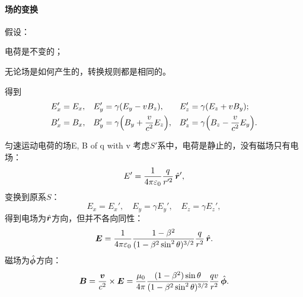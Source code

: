 \paragraph{场的变换}
假设：
\begin{compactenum}
	\item 电荷是不变的；
	\item 无论场是如何产生的，转换规则都是相同的。
\end{compactenum}
得到
\begin{align}
    E_x' &= E_x,&E_y' &= \gamma(E_y - vB_z),&E_z' &= \gamma(E_z + vB_y);\\
    B_x' &= B_x,&B_y' &= \gamma\Bigl(B_y + \frac v{c^2}E_z\Bigr),&B_z' &= \gamma\Bigl(B_z - \frac v{c^2}E_y\Bigr).
\end{align}
\begin{example}{匀速运动电荷的场}{E, B of q with v}
    考虑$S'$系中，电荷是静止的，没有磁场只有电场：
    \[
        E' = \frac1{4\pi\varepsilon_0}\frac q{r'^2}\mathop{}\!\hat{\bm{r}}',
    \]
    变换到原系$S$：
    \[
        E_x = E_x',\quad E_y = \gamma E_y',\quad E_z = \gamma E_z',
    \]
    得到电场为$\mathop{}\!\hat{\bm{r}}$方向，但并不各向同性：
    \begin{equation}
        \bm E = \frac1{4\pi\varepsilon_0}\frac{1 - \beta^2}{(1 - \beta^2\sin^2\theta)^{3/2}}\frac q{r^2}\mathop{}\!\hat{\bm{r}}.
    \end{equation}
    磁场为$\mathop{}\!\hat{\bm{\phi}}$方向：
    \begin{equation}
        \bm B = \frac{\bm v}{c^2} \times \bm E = \frac{\mu_0}{4\pi}\frac{(1 - \beta^2)\sin\theta}{(1 - \beta^2\sin^2\theta)^{3/2}}\frac{qv}{r^2}\mathop{}\!\hat{\bm{\phi}}.
    \end{equation}
\end{example}
